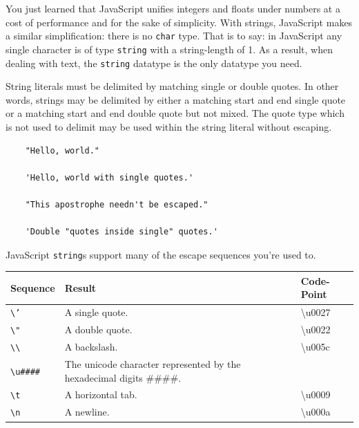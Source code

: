 \documentclass[11pt,letter]{book}
\begin{document}
    You just learned that JavaScript unifies integers and floats under numbers at a cost of 
    performance and for the sake of simplicity. With strings, JavaScript makes a similar 
    simplification: there is no \texttt{char} type. That is to say: in JavaScript any single 
    character is of type \texttt{string} with a string-length of 1. As a result, when dealing with  
    text, the \texttt{string} datatype is the only datatype you need.
    
    String literals must be delimited by matching single or double quotes. In other words, strings 
    may be delimited by either a matching start and end single quote or a matching start and end 
    double quote but not mixed. The quote type which is not used to delimit may be used within the 
    string literal without escaping.
    
    \begin{verbatim}
    "Hello, world."
    
    'Hello, world with single quotes.'
    
    "This apostrophe needn't be escaped."
    
    'Double "quotes inside single" quotes.'
    \end{verbatim}
    
    JavaScript \texttt{string}s support many of the escape sequences you're used to.
    
    \vspace{10pt}
    \begin{tabular}{l|l|l}
        Sequence & Result & Code-Point \\
        \hline
        \texttt{\textbackslash{'}}  & A single quote. & \textbackslash{u0027} \\
        \texttt{\textbackslash{"}}  & A double quote. & \textbackslash{u0022} \\
        \texttt{\textbackslash\textbackslash} 
                                    & A backslash. & \textbackslash{u005c} \\
        \texttt{\textbackslash{u\#\#\#\#}}
                                    & The unicode character represented by the hexadecimal
                                        digits \#\#\#\#. & \\
        \texttt{\textbackslash{t}}  & A horizontal tab. & \textbackslash{u0009} \\
        \texttt{\textbackslash{n}}  & A newline. & \textbackslash{u000a} \\
    \end{tabular}
    \vspace{10pt}
    
\end{document}

